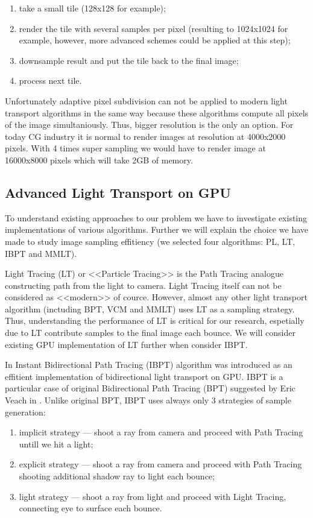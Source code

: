 \documentclass[twoside,twocolumn,10pt]{article}
\begin{document}
\begin{enumerate}
  \item take a small tile (128x128 for example);
  \item render the tile with several samples per pixel (resulting to 1024x1024 for example, however, more advanced schemes could be applied at this step);
  \item downsample result and put the tile back to the final image;
  \item process next tile.
\end{enumerate} 

Unfortunately adaptive pixel subdivision can not be applied to modern light transport algorithms in the same way because these algorithms compute all pixels of the image simultaniously. Thus, bigger resolution is the only an option. For today CG industry it is normal to render images at resolution at 4000x2000 pixels. With 4 times super sampling we would have to render image at 16000x8000 pixels which will take 2GB of memory. 

\subsection*{Advanced Light Transport on GPU}

To understand existing approaches to our problem we have to investigate existing implementations of various algorithms. Further we will explain the choice we have made to study image sampling effitiency (we selected four algorithms: PL, LT, IBPT and MMLT). 

Light Tracing (LT) or <<Particle Tracing>> \cite{PBRT} is the Path Tracing analogue constructing path from the light to camera. Light Tracing itself can not be considered as <<modern>> of cource. However, almost any other light transport algorithm (inctuding BPT, VCM and MMLT) uses LT as a sampling strategy. Thus, understanding the performance of LT is critical for our research, espetially due to LT contribute samples to the final image each bounce. We will consider existing GPU implementation of LT further when consider IBPT.

In \cite{Bogolepov13} Instant Bidirectional Path Tracing (IBPT) algorithm was introduced as an effitient implementation of bidirectional light transport on GPU. IBPT is a particular case of original Bidirectional Path Tracing (BPT) suggested by Eric Veach in \cite{Veach98}. Unlike original BPT, IBPT uses always only 3 strategies of sample generation: 
\begin{enumerate}
\item implicit strategy --- shoot a ray from camera and proceed with Path Tracing untill we hit a light;
\item explicit strategy --- shoot a ray from camera and proceed with Path Tracing shooting additional shadow ray to light each bounce;
\item light strategy --- shoot a ray from light and proceed with Light Tracing, connecting eye to surface each bounce. 
\end{enumerate}
\end{document}
